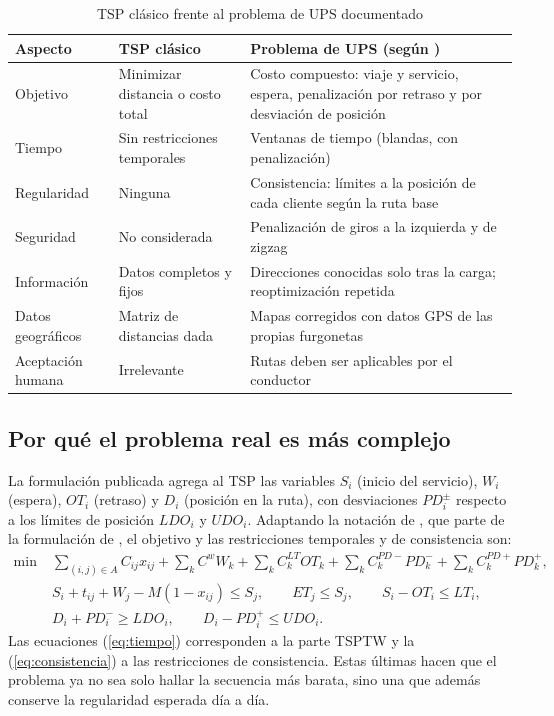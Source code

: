 \documentclass[11pt,a4paper]{article}
\begin{document}
\begin{table}[ht]
\centering\small
\caption{TSP clásico frente al problema de UPS documentado}
\label{tab:comparacion}
\begin{tabularx}{\textwidth}{@{}>{\raggedright\arraybackslash}p{3.0cm} X X@{}}
\toprule
Aspecto & TSP clásico & Problema de UPS (según \textcite{holland2017}) \\
\midrule
Objetivo & Minimizar distancia o costo total & Costo compuesto: viaje y servicio, espera, penalización por retraso y por desviación de posición \\
Tiempo & Sin restricciones temporales & Ventanas de tiempo (blandas, con penalización) \\
Regularidad & Ninguna & Consistencia: límites a la posición de cada cliente según la ruta base \\
Seguridad & No considerada & Penalización de giros a la izquierda y de zigzag \\
Información & Datos completos y fijos & Direcciones conocidas solo tras la carga; reoptimización repetida \\
Datos geográficos & Matriz de distancias dada & Mapas corregidos con datos GPS de las propias furgonetas \\
Aceptación humana & Irrelevante & Rutas deben ser aplicables por el conductor \\
\bottomrule
\end{tabularx}
\end{table}

\subsection{Por qué el problema real es más complejo}
La formulación publicada agrega al TSP las variables $S_i$ (inicio del servicio), $W_i$ (espera), $OT_i$ (retraso) y $D_i$ (posición en la ruta), con desviaciones $PD_i^{\pm}$ respecto a los límites de posición $LDO_i$ y $UDO_i$. Adaptando la notación de \textcite[Apéndice]{holland2017}, que parte de la formulación de \textcite{dash2012}, el objetivo y las restricciones temporales y de consistencia son:
\begin{align}
\min\;& \sum_{(i,j)\in A} C_{ij}x_{ij}+\sum_{k} C^{w}W_k+\sum_{k} C^{LT}_k OT_k+\sum_{k} C^{PD-}_k PD^{-}_k+\sum_{k} C^{PD+}_k PD^{+}_k, \label{eq:orion}\\
& S_i + t_{ij} + W_j - M(1-x_{ij}) \le S_j, \qquad ET_j \le S_j, \qquad S_i - OT_i \le LT_i, \label{eq:tiempo}\\
& D_i + PD_i^{-} \ge LDO_i, \qquad D_i - PD_i^{+} \le UDO_i. \label{eq:consistencia}
\end{align}
Las ecuaciones (\ref{eq:tiempo}) corresponden a la parte TSPTW y la (\ref{eq:consistencia}) a las restricciones de consistencia. Estas últimas hacen que el problema ya no sea solo hallar la secuencia más barata, sino una que además conserve la regularidad esperada día a día.
\end{document}
